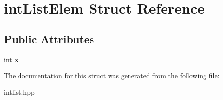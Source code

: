 \hypertarget{structintListElem}{\section{int\-List\-Elem \-Struct \-Reference}
\label{structintListElem}
}
\subsection*{\-Public \-Attributes}
\begin{DoxyCompactItemize}
\item 
\hypertarget{structintListElem_aae326f584b1a451455723d8ece05a294}{int {\bfseries x}}\label{structintListElem_aae326f584b1a451455723d8ece05a294}

\end{DoxyCompactItemize}


\-The documentation for this struct was generated from the following file\-:\begin{DoxyCompactItemize}
\item 
intlist.\-hpp\end{DoxyCompactItemize}
